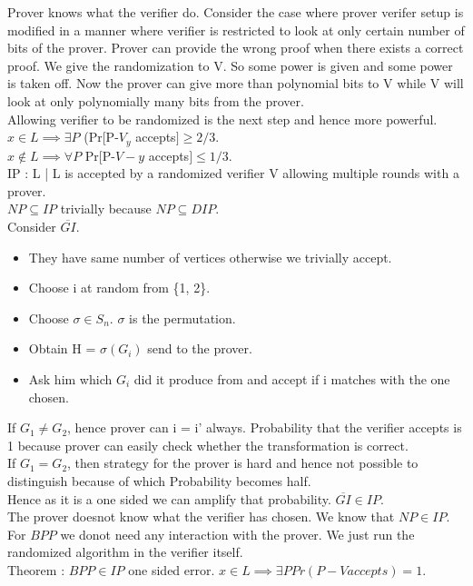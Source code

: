 \documentclass[solution,addpoints,12pt]{exam}
\begin{document}
Prover knows what the verifier do.
Consider the case where prover verifer setup is modified in a manner
where verifier is restricted to look at only certain number of
bits of the prover. Prover can provide the wrong proof
when there exists a correct proof.
We give the randomization to V. So some power
is given and some power is taken off. Now the prover can
give more than polynomial bits to V while V will look
at only polynomially many bits from the prover.\\
Allowing verifier to be randomized is the next step and hence more powerful.\\
$x \in L \implies \exists P$ (Pr[P-$V_y$ accepts$] \ge 2/3$.\\
$x \not \in L \implies \forall P$ Pr[P-$V-y$ accepts$] \le 1/3$.\\
IP : L | L is accepted by a randomized verifier V allowing
multiple rounds with a prover.\\
$NP \subseteq IP$ trivially because $NP \subseteq DIP$.\\
Consider $\overline{GI}$.\\
\begin{itemize}
\item They have same number of vertices otherwise we trivially accept.
\item Choose i at random from \{1, 2\}.
\item Choose $\sigma \in S_n$. $\sigma$ is the permutation.
\item Obtain H = $\sigma(G_i)$ send to the prover.
\item Ask him which $G_i$ did it produce from and accept
if i matches with the one chosen.
\end{itemize}
If $G_1 \ne G_2$, hence prover can i = i' always.
Probability that the verifier accepts is 1 because prover can easily
check whether the transformation is correct.\\
If $G_1 = G_2$, then strategy for the prover is hard and hence not
possible to distinguish because of which Probability becomes half.\\
Hence as it is a one sided we can amplify that probability.
$\overline{GI} \in IP$.\\
The prover doesnot know what the verifier has chosen.
We know that $NP \in IP$. For $BPP$ we donot
need any interaction with the prover. We just run the randomized
algorithm in the verifier itself.\\
Theorem : $BPP \in IP$ one sided error.
$x \in L \implies \exists P Pr(P-V accepts) = 1$.\\
\end{document}
